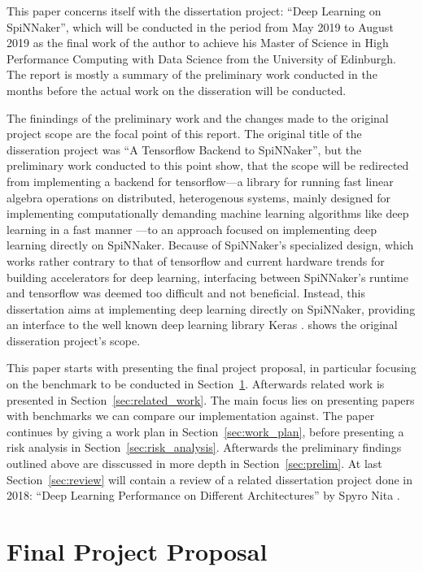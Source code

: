 \documentclass{article}
\begin{document}
This paper concerns itself with the dissertation project:
``Deep Learning on SpiNNaker'', which will be conducted in
the period from May 2019 to August 2019 as the final work
of the author to achieve his Master of Science in
High Performance Computing with Data Science from the
University of Edinburgh.
The report is mostly a summary of the preliminary work
conducted in the months before the actual work on the
disseration will be conducted.

The finindings of the preliminary work and the changes made
to the original project scope are the focal point of this
report.
The original title of the disseration project was ``A
Tensorflow Backend to SpiNNaker'', but the preliminary work
conducted to this point show, that the scope will be
redirected from implementing a backend for tensorflow---a
library for running fast linear algebra operations on
distributed, heterogenous systems, mainly designed for
implementing computationally demanding machine learning
algorithms like deep learning in a fast manner
\citep{tf2015}---to an approach focused on implementing
deep learning directly on SpiNNaker.
Because of SpiNNaker's specialized design, which works
rather contrary to that of tensorflow and current hardware
trends for building accelerators for deep learning,
interfacing between SpiNNaker's runtime and tensorflow was
deemed too difficult and not beneficial.
Instead, this dissertation aims at implementing deep
learning directly on SpiNNaker, providing an interface to
the well known deep learning library Keras \citep{keras}.
\citet{proj} shows the original disseration project's
scope.

This paper starts with presenting the final project
proposal, in particular focusing on the benchmark to be
conducted in Section~\ref{sec:proposal}.
Afterwards related work is presented in
Section~\ref{sec:related_work}.
The main focus lies on presenting papers with benchmarks
we can compare our implementation against.
The paper continues by giving a work plan in
Section~\ref{sec:work_plan}, before presenting a risk
analysis in Section~\ref{sec:risk_analysis}.
Afterwards the preliminary findings outlined above are
disscussed in more depth in Section~\ref{sec:prelim}.
At last Section~\ref{sec:review} will contain a review of a
related dissertation project done in 2018:
``Deep Learning Performance on Different Architectures'' by
Spyro Nita \citep{nita_2018}.


\section{Final Project Proposal} %
\label{sec:proposal}
\end{document}
